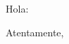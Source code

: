 \documentclass[letterpaper,12pt]{letter}
\begin{document}
\signature{Juan Pedro Villa Isaza}

\address{}
\date{El Retiro, \today}

\begin{letter}{}

\opening{Hola:}

\lipsum[1-2]

\closing{Atentamente,}

\end{letter}
\end{document}
